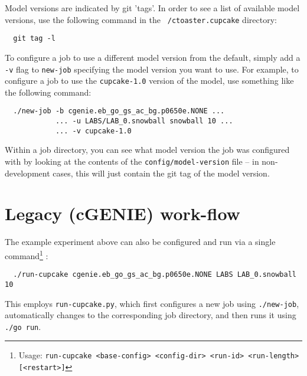 \documentclass[a4paper,10pt,article]{memoir}
\begin{document}
Model versions are indicated by git 'tags'.  In order to see a list
of available model versions, use the following command in the
\texttt{~/ctoaster.cupcake} directory:
\begin{verbatim}
  git tag -l
\end{verbatim}
To configure a job to use a different model version from the default,
simply add a \texttt{-v} flag to \texttt{new-job} specifying the model
version you want to use.  For example, to configure a job to use the
\texttt{cupcake-1.0} version of the model, use something like the
following command:
\begin{verbatim}
  ./new-job -b cgenie.eb_go_gs_ac_bg.p0650e.NONE ...
            ... -u LABS/LAB_0.snowball snowball 10 ...
            ... -v cupcake-1.0
\end{verbatim}
Within a job directory, you can see what model version the job was
configured with by looking at the contents of the
\texttt{config/model-version} file -- in non-development cases, this
will just contain the git tag of the model version.

\section{Legacy (cGENIE) work-flow}

The example experiment above can also be configured and run via a single command\footnote{Usage: \texttt{run-cupcake <base-config> <config-dir> <run-id> <run-length> [<restart>]}} :
\begin{verbatim}
  ./run-cupcake cgenie.eb_go_gs_ac_bg.p0650e.NONE LABS LAB_0.snowball 10
\end{verbatim}
This employs \texttt{run-cupcake.py}, which first configures a new job using \texttt{./new-job},
automatically changes to the corresponding job directory, and then runs it using \texttt{./go run}.


\newpage

\end{document}

